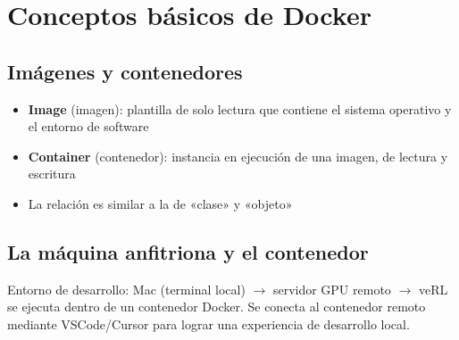 \section{Conceptos básicos de Docker}
\subsection{Imágenes y contenedores}
\begin{itemize}
  \item \textbf{Image} (imagen): plantilla de solo lectura que contiene el sistema operativo y el entorno de software
  \item \textbf{Container} (contenedor): instancia en ejecución de una imagen, de lectura y escritura
  \item La relación es similar a la de «clase» y «objeto»
\end{itemize}

\subsection{La máquina anfitriona y el contenedor}
Entorno de desarrollo: Mac (terminal local) $\to$ servidor GPU remoto $\to$ veRL se ejecuta dentro de un contenedor Docker. Se conecta al contenedor remoto mediante VSCode/Cursor para lograr una experiencia de desarrollo local.

